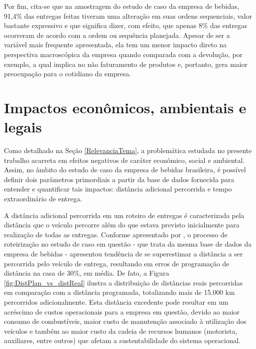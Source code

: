 Por fim, cita-se que na amostragem do estudo de caso da empresa de bebidas, 91,4\% das entregas feitas tiveram uma alteração em suas ordens sequenciais, valor bastante expressivo e que significa dizer, com efeito, que apenas 8\% das entregas ocorreram de acordo com a ordem ou sequência planejada. Apesar de ser a variável mais frequente apresentada, ela tem um menor impacto direto na perspectiva macroscópica da empresa quando comparada com a devolução, por exemplo, a qual implica no não faturamento de produtos e, portanto, gera maior preocupação para o cotidiano da empresa. 

\section{Impactos econômicos, ambientais e legais} \label{sec:impactoBebidas}

Como detalhado na Seção \ref{RelevanciaTema}, a problemática estudada no presente trabalho acarreta em efeitos negativos de caráter econômico, social e ambiental. Assim, no âmbito do estudo de caso da empresa de bebidas brasileira, é possível definir dois parâmetros primordiais a partir da base de dados fornecida para entender e quantificar tais impactos: distância adicional percorrida e tempo extraordinário de entrega.

A distância adicional percorrida em um roteiro de entregas é caracterizada pela distância que o veículo percorre além do que estava previsto inicialmente para realização de todas as entregas. 
Conforme apresentado por , o processo de roteirização no estudo de caso em questão - que trata da mesma base de dados da empresa de bebidas - apresentou tendência de se superestimar a distância a ser percorrida pelo veículo de entrega, resultando em erros de programação de distância na casa de 30\%, em média.
De fato, a Figura \ref{fig:DistPlan_vs_distReal} ilustra a distribuição de distâncias reais percorridas em comparação com a distância programada, totalizando mais de 15.000 km percorridos adicionalmente.
Esta distância excedente pode resultar em um acréscimo de custos operacionais para a empresa em questão, devido ao maior consumo de combustíveis, maior custo de manutenção associado à utilização dos veículos e também ao maior custo da cadeia de recursos humanos (motorista, auxiliares, entre outros) que afetam a sustentabilidade do sistema operacional.

